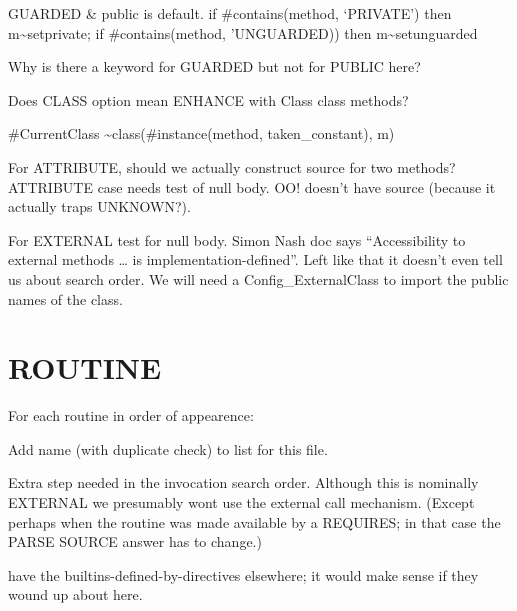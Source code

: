 GUARDED \& public is default. if \#contains(method, `PRIVATE') then
m\textasciitilde setprivate; if \#contains(method, 'UNGUARDED)) then
m\textasciitilde setunguarded

Why is there a keyword for GUARDED but not for PUBLIC here?

Does CLASS option mean ENHANCE with Class class methods?

\#CurrentClass \textasciitilde class(\#instance(method,
taken\_constant), m)

For ATTRIBUTE, should we actually construct source for two methods?
ATTRIBUTE case needs test of null body. OO! doesn't have source (because
it actually traps UNKNOWN?).

For EXTERNAL test for null body. Simon Nash doc says ``Accessibility to
external methods \ldots{} is implementation-defined''. Left like that it
doesn't even tell us about search order. We will need a
Config\_ExternalClass to import the public names of the class.

\section{ROUTINE}\label{routine}

For each routine in order of appearence:

Add name (with duplicate check) to list for this file.

Extra step needed in the invocation search order. Although this is
nominally EXTERNAL we presumably wont use the external call mechanism.
(Except perhaps when the routine was made available by a REQUIRES; in
that case the PARSE SOURCE answer has to change.)

have the builtins-defined-by-directives elsewhere; it would make sense
if they wound up about here.
